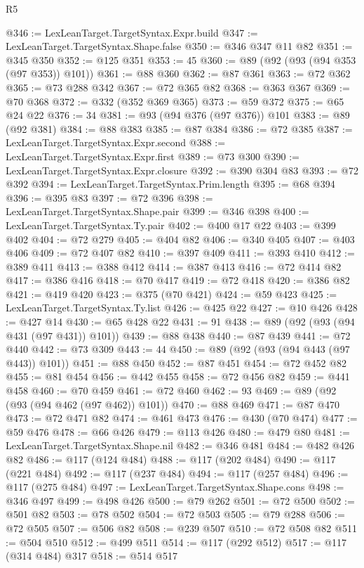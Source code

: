 \begin{lexlean}{R5}
\begin{coremodule}
@346 := LexLeanTarget.TargetSyntax.Expr.build
@347 := LexLeanTarget.TargetSyntax.Shape.false
@350 := @346 @347 @11 @82
@351 := @345 @350
@352 := @125 @351
@353 := 45
@360 := @89 (@92 (@93 (@94 @353 (@97 @353)) @101))
@361 := @88 @360
@362 := @87 @361
@363 := @72 @362
@365 := @73 @288 @342
@367 := @72 @365 @82
@368 := @363 @367
@369 := @70 @368
@372 := @332 (@352 @369 @365)
@373 := @59 @372
@375 := @65 @24 @22
@376 := 34
@381 := @93 (@94 @376 (@97 @376)) @101
@383 := @89 (@92 @381)
@384 := @88 @383
@385 := @87 @384
@386 := @72 @385
@387 := LexLeanTarget.TargetSyntax.Expr.second
@388 := LexLeanTarget.TargetSyntax.Expr.first
@389 := @73 @300
@390 := LexLeanTarget.TargetSyntax.Expr.closure
@392 := @390 @304 @83
@393 := @72 @392
@394 := LexLeanTarget.TargetSyntax.Prim.length
@395 := @68 @394
@396 := @395 @83
@397 := @72 @396
@398 := LexLeanTarget.TargetSyntax.Shape.pair
@399 := @346 @398
@400 := LexLeanTarget.TargetSyntax.Ty.pair
@402 := @400 @17 @22
@403 := @399 @402
@404 := @72 @279
@405 := @404 @82
@406 := @340 @405
@407 := @403 @406
@409 := @72 @407 @82
@410 := @397 @409
@411 := @393 @410
@412 := @389 @411
@413 := @388 @412
@414 := @387 @413
@416 := @72 @414 @82
@417 := @386 @416
@418 := @70 @417
@419 := @72 @418
@420 := @386 @82
@421 := @419 @420
@423 := @375 (@70 @421)
@424 := @59 @423
@425 := LexLeanTarget.TargetSyntax.Ty.list
@426 := @425 @22
@427 := @10 @426
@428 := @427 @14
@430 := @65 @428 @22
@431 := 91
@438 := @89 (@92 (@93 (@94 @431 (@97 @431)) @101))
@439 := @88 @438
@440 := @87 @439
@441 := @72 @440
@442 := @73 @309
@443 := 44
@450 := @89 (@92 (@93 (@94 @443 (@97 @443)) @101))
@451 := @88 @450
@452 := @87 @451
@454 := @72 @452 @82
@455 := @81 @454
@456 := @442 @455
@458 := @72 @456 @82
@459 := @441 @458
@460 := @70 @459
@461 := @72 @460
@462 := 93
@469 := @89 (@92 (@93 (@94 @462 (@97 @462)) @101))
@470 := @88 @469
@471 := @87 @470
@473 := @72 @471 @82
@474 := @461 @473
@476 := @430 (@70 @474)
@477 := @59 @476
@478 := @66 @426
@479 := @113 @426
@480 := @479 @80
@481 := LexLeanTarget.TargetSyntax.Shape.nil
@482 := @346 @481
@484 := @482 @426 @82
@486 := @117 (@124 @484)
@488 := @117 (@202 @484)
@490 := @117 (@221 @484)
@492 := @117 (@237 @484)
@494 := @117 (@257 @484)
@496 := @117 (@275 @484)
@497 := LexLeanTarget.TargetSyntax.Shape.cons
@498 := @346 @497
@499 := @498 @426
@500 := @79 @262
@501 := @72 @500
@502 := @501 @82
@503 := @78 @502
@504 := @72 @503
@505 := @79 @288
@506 := @72 @505
@507 := @506 @82
@508 := @239 @507
@510 := @72 @508 @82
@511 := @504 @510
@512 := @499 @511
@514 := @117 (@292 @512)
@517 := @117 (@314 @484) @317
@518 := @514 @517

\end{coremodule}
\end{lexlean}
